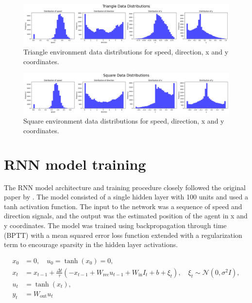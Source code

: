 \documentclass{article}
\begin{document}
\begin{figure}
    \centering
    \includegraphics[width=\textwidth]{figures/triangle_data_distribution.png}
    \caption{Triangle environment data distributions for speed, direction, x and y coordinates.}
    \label{fig:triangle_data_distribution}
\end{figure}

\begin{figure}
    \centering
    \includegraphics[width=\textwidth]{figures/square_data_distribution.png}
    \caption{Square environment data distributions for speed, direction, x and y coordinates.}
    \label{fig:square_data_distribution}
\end{figure}


\section{RNN model training}
The RNN model architecture and training procedure closely followed the original paper by \cite{chaplot2018active}. The model consisted of a single hidden layer with 100 units and used a tanh activation function. The input to the network was a sequence of speed and direction signals, and the output was the estimated position of the agent in x and y coordinates. The model was trained using backpropagation through time (BPTT) with a mean squared error loss function extended with a regularization term to encourage sparsity in the hidden layer activations.


\begin{align}
\label{eq:rnn_init}
x_0 &= 0, \quad u_0 = \tanh(x_0) = 0, \\[0.5em]
\label{eq:rnn_update}
x_t &= x_{t-1}
  + \frac{\Delta t}{\tau}
    \left(
      -x_{t-1}
      + W_{\mathrm{rec}} u_{t-1}
      + W_{\mathrm{in}} I_t
      + b
      + \xi_t
    \right),
  \quad \xi_t \sim \mathcal{N}(0, \sigma^2 I), \\[0.8em]
\label{eq:rnn_activations}
u_t &= \tanh(x_t), \\[0.5em]
\label{eq:rnn_out}
y_t &= W_{\mathrm{out}} u_t
\end{align}
\end{document}
